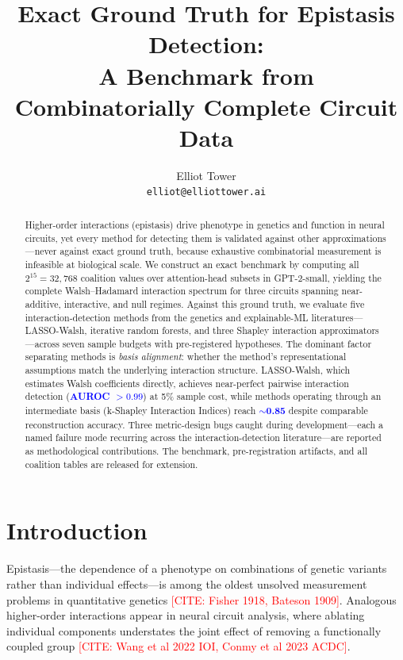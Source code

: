 \documentclass[11pt]{article}
\title{Exact Ground Truth for Epistasis Detection:\\A Benchmark from Combinatorially Complete Circuit Data}
\author{
  Elliot Tower \\
  \texttt{elliot@elliottower.ai}
}
\newcommand{\citeneeded}[1]{\textcolor{red}{[CITE: #1]}}
\newcommand{\numplaceholder}[1]{\textcolor{blue}{\textbf{#1}}}
\begin{document}
\maketitle

\begin{abstract}
Higher-order interactions (epistasis) drive phenotype in genetics and
function in neural circuits, yet every method for detecting them is
validated against other approximations---never against exact ground truth,
because exhaustive combinatorial measurement is infeasible at biological
scale. We construct an exact benchmark by computing all $2^{15} = 32{,}768$
coalition values over attention-head subsets in GPT-2-small, yielding
the complete Walsh--Hadamard interaction spectrum for three circuits
spanning near-additive, interactive, and null regimes. Against this
ground truth, we evaluate five interaction-detection methods from the
genetics and explainable-ML literatures---LASSO-Walsh, iterative random
forests, and three Shapley interaction approximators---across seven
sample budgets with pre-registered hypotheses.
%
The dominant factor separating methods is \emph{basis alignment}: whether
the method's representational assumptions match the underlying
interaction structure. LASSO-Walsh, which estimates Walsh coefficients
directly, achieves near-perfect pairwise interaction detection
(\numplaceholder{AUROC $> 0.99$}) at 5\% sample cost, while methods
operating through an intermediate basis (k-Shapley Interaction Indices)
reach \numplaceholder{$\sim$0.85} despite comparable reconstruction
accuracy. Three metric-design bugs caught during development---each a
named failure mode recurring across the interaction-detection
literature---are reported as methodological contributions. The benchmark,
pre-registration artifacts, and all coalition tables are released for
extension.
\end{abstract}


\section{Introduction}
\label{sec:intro}



Epistasis---the dependence of a phenotype on combinations of genetic
variants rather than individual effects---is among the oldest unsolved
measurement problems in quantitative genetics \citeneeded{Fisher 1918,
Bateson 1909}. Analogous higher-order interactions appear in neural
circuit analysis, where ablating individual components understates the
joint effect of removing a functionally coupled group
\citeneeded{Wang et al 2022 IOI, Conmy et al 2023 ACDC}.
\end{document}
